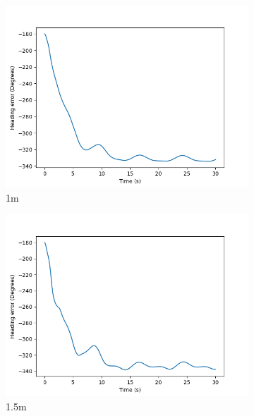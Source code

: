 \documentclass[class=article, crop=false]{standalone}
\begin{document}
\begin{figure}
\begin{subfigure}[b]{0.48\textwidth}
        \includegraphics{scenario1/rov-50m/1.0m/usv_heading_error_controlled}
        \caption{1m}
        \label{}
    \end{subfigure}
    \hfill
    \begin{subfigure}[b]{0.48\textwidth}
        \centering
        \includegraphics{scenario1/rov-50m/1.5m/usv_heading_error_controlled}
        \caption{1.5m}
        \label{}
    \end{subfigure}
    \vfill
    \begin{subfigure}[b]{0.48\textwidth}
        \centering

\end{subfigure}
\end{figure}
\end{document}
